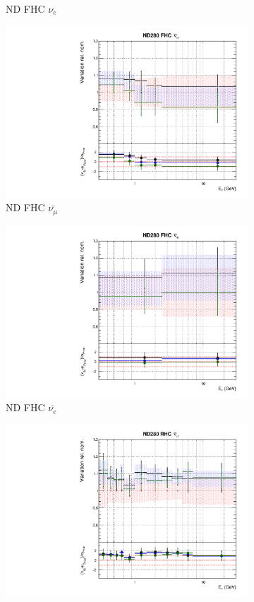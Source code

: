 \begin{figure}
\begin{subfigure}{0.24\textwidth}
  \caption{ND FHC $\nu_e$}
\end{subfigure}
\begin{subfigure}{0.24\textwidth}
  \centering
  \includegraphics[width=0.95\linewidth]{figs/fhcrhcfitsflux_2}
  \caption{ND FHC $\bar{\nu_{\mu}}$}
\end{subfigure}
\begin{subfigure}{0.24\textwidth}
  \centering
  \includegraphics[width=0.95\linewidth]{figs/fhcrhcfitsflux_3}
  \caption{ND FHC $\bar{\nu_{e}}$}
\end{subfigure}
\begin{subfigure}{0.24\textwidth}
  \centering
  \includegraphics[width=0.95\linewidth]{figs/fhcrhcfitsflux_4}

\end{subfigure}
\end{figure}
